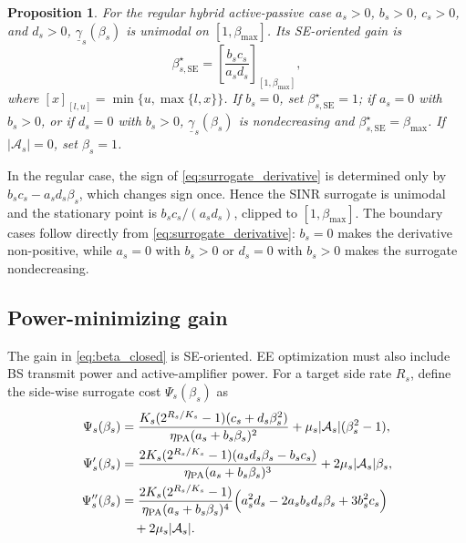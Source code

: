 \documentclass[journal]{IEEEtran}
\newtheorem{proposition}{Proposition}
\begin{document}
\begin{proposition}\label{prop:se_optimal}
For the regular hybrid active-passive case $a_s>0$, $b_s>0$, $c_s>0$, and $d_s>0$, $\underline{\gamma}_s(\beta_s)$ is unimodal on $[1,\beta_{\max}]$. Its SE-oriented gain is
\begin{equation}
\beta_{s,\mathrm{SE}}^\star=
\left[\frac{b_sc_s}{a_sd_s}\right]_{[1,\beta_{\max}]},
\label{eq:beta_closed}
\end{equation}
where $[x]_{[l,u]}=\min\{u,\max\{l,x\}\}$. If $b_s=0$, set $\beta_{s,\mathrm{SE}}^\star=1$; if $a_s=0$ with $b_s>0$, or if $d_s=0$ with $b_s>0$, $\underline{\gamma}_s(\beta_s)$ is nondecreasing and $\beta_{s,\mathrm{SE}}^\star=\beta_{\max}$. If $|\mathcal{A}_s|=0$, set $\beta_s=1$.
\end{proposition}

\begin{IEEEproof}
In the regular case, the sign of \eqref{eq:surrogate_derivative} is determined only by $b_sc_s-a_sd_s\beta_s$, which changes sign once. Hence the SINR surrogate is unimodal and the stationary point is $b_sc_s/(a_sd_s)$, clipped to $[1,\beta_{\max}]$. The boundary cases follow directly from \eqref{eq:surrogate_derivative}: $b_s=0$ makes the derivative non-positive, while $a_s=0$ with $b_s>0$ or $d_s=0$ with $b_s>0$ makes the surrogate nondecreasing.
\end{IEEEproof}

\subsection{Power-minimizing gain}
The gain in \eqref{eq:beta_closed} is SE-oriented. EE optimization must also include BS transmit power and active-amplifier power. For a target side rate $R_s$, define the side-wise surrogate cost $\Psi_s(\beta_s)$ as
\begin{align}
\Psi_s(\beta_s)
&=\frac{K_s(2^{R_s/K_s}-1)(c_s+d_s\beta_s^2)}{\eta_{\mathrm{PA}}(a_s+b_s\beta_s)^2}
+\mu_s|\mathcal{A}_s|(\beta_s^2-1),
\label{eq:side_cost}\\
\Psi_s'(\beta_s)
&=\frac{2K_s(2^{R_s/K_s}-1)(a_sd_s\beta_s-b_sc_s)}{\eta_{\mathrm{PA}}(a_s+b_s\beta_s)^3}
+2\mu_s|\mathcal{A}_s|\beta_s,
\label{eq:side_derivative}\\
\Psi_s''(\beta_s)
&=\frac{2K_s(2^{R_s/K_s}-1)}{\eta_{\mathrm{PA}}(a_s+b_s\beta_s)^4}
\Big(a_s^2d_s-2a_sb_sd_s\beta_s+3b_s^2c_s\Big) \notag\\
&\quad +2\mu_s|\mathcal{A}_s|.
\label{eq:side_second}
\end{align}
\end{document}
